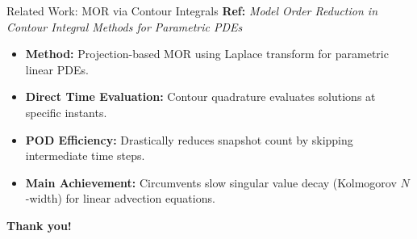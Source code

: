 \documentclass[aspectratio=169]{beamer}
\begin{document}
\begin{frame}{Related Work: MOR via Contour Integrals}
  \textbf{Ref:} \textit{Model Order Reduction in Contour Integral Methods for Parametric PDEs}
  
  \vspace{1em}
  \begin{itemize}
      \item \textbf{Method:} Projection-based MOR using Laplace transform for parametric linear PDEs.
      \item \textbf{Direct Time Evaluation:} Contour quadrature evaluates solutions at specific instants.
      \item \textbf{POD Efficiency:} Drastically reduces snapshot count by skipping intermediate time steps.
      \item \textbf{Main Achievement:} Circumvents slow singular value decay (Kolmogorov $N$-width) for linear advection equations.
  \end{itemize}
\end{frame}


\begin{frame}
  \begin{center}
      \Huge \textbf{Thank you!}
  \end{center}
\end{frame}
\end{document}
